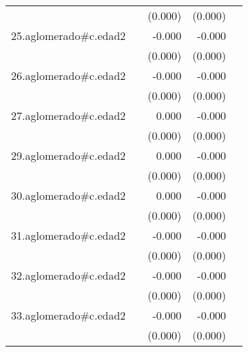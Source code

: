 {\begin{longtable}{l*{4}{D{.}{.}{-1}}}
            &                     &     (0.000)         &     (0.000)         &                     \\
\addlinespace
25.aglomerado#c.edad2&                     &      -0.000         &      -0.000         &                     \\
            &                     &     (0.000)         &     (0.000)         &                     \\
\addlinespace
26.aglomerado#c.edad2&                     &      -0.000         &      -0.000\sym{***}&                     \\
            &                     &     (0.000)         &     (0.000)         &                     \\
\addlinespace
27.aglomerado#c.edad2&                     &       0.000         &      -0.000         &                     \\
            &                     &     (0.000)         &     (0.000)         &                     \\
\addlinespace
29.aglomerado#c.edad2&                     &       0.000         &      -0.000         &                     \\
            &                     &     (0.000)         &     (0.000)         &                     \\
\addlinespace
30.aglomerado#c.edad2&                     &       0.000         &      -0.000         &                     \\
            &                     &     (0.000)         &     (0.000)         &                     \\
\addlinespace
31.aglomerado#c.edad2&                     &      -0.000         &      -0.000\sym{***}&                     \\
            &                     &     (0.000)         &     (0.000)         &                     \\
\addlinespace
32.aglomerado#c.edad2&                     &      -0.000         &      -0.000\sym{***}&                     \\
            &                     &     (0.000)         &     (0.000)         &                     \\
\addlinespace
33.aglomerado#c.edad2&                     &      -0.000         &      -0.000\sym{**} &                     \\
            &                     &     (0.000)         &     (0.000)         &                     \\

\end{longtable}}
